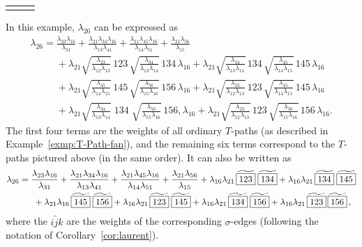 \documentclass[11pt]{article}
\numberwithin{equation}{section}
\numberwithin{equation}{section}
\begin{document}
\begin{Example}
\begin{center}
\begin{center}
\begin{tabular}{ccc}
\begin{tikzpicture}
\end{tikzpicture} 
\end{tabular}
\end{center}
\end{center}
In this example, $\lambda_{26}$ can be expressed as
 \begin{gather*}
 \lambda_{26} = \frac{\lambda_{23}\lambda_{16}}{\lambda_{31}}
 + \frac{\lambda_{21}\lambda_{34}\lambda_{16}}{\lambda_{13}\lambda_{41}}
 + \frac{\lambda_{21}\lambda_{45}\lambda_{16}}{\lambda_{14}\lambda_{51}}
 + \frac{\lambda_{21}\lambda_{56}}{\lambda_{15}} \\
 \phantom{\lambda_{26}=} + \lambda_{21} \sqrt{\frac{\lambda_{23}}{\lambda_{12}\lambda_{13}}} \, \boxed{123} \, \sqrt{\frac{\lambda_{34}}{\lambda_{13}\lambda_{14}}} \, \boxed{134} \, \lambda_{16}
+ \lambda_{21} \sqrt{\frac{\lambda_{34}}{\lambda_{13}\lambda_{14}}} \, \boxed{134} \, \sqrt{\frac{\lambda_{45}}{\lambda_{14}\lambda_{15}}} \, \boxed{145} \, \lambda_{16} \\
 \phantom{\lambda_{26}=} + \lambda_{21} \sqrt{\frac{\lambda_{45}}{\lambda_{14}\lambda_{15}}} \, \boxed{145} \, \sqrt{\frac{\lambda_{56}}{\lambda_{15}\lambda_{16}}} \, \boxed{156} \, \lambda_{16}
+ \lambda_{21} \sqrt{\frac{\lambda_{23}}{\lambda_{12}\lambda_{13}}} \, \boxed{123} \, \sqrt{\frac{\lambda_{45}}{\lambda_{14}\lambda_{15}}} \, \boxed{145} \, \lambda_{16} \\
 \phantom{\lambda_{26}=} + \lambda_{21} \sqrt{\frac{\lambda_{34}}{\lambda_{13}\lambda_{14}}} \; \boxed{134} \; \sqrt{\frac{\lambda_{56}}{\lambda_{15}\lambda_{16}}} \, \boxed{156} , \lambda_{16}
+ \lambda_{21} \sqrt{\frac{\lambda_{23}}{\lambda_{12}\lambda_{13}}} \, \boxed{123} \, \sqrt{\frac{\lambda_{56}}{\lambda_{15}\lambda_{16}}} \, \boxed{156} \, \lambda_{16}.
 \end{gather*}
 The first four terms are the weights of all ordinary $T$-paths (as described in Example~\ref{exmp:T-Path-fan}),
 and the remaining six terms correspond to the $T$-paths pictured above (in the same order).
 It can also be written as
 \begin{gather*}
 \lambda_{26} = \frac{\lambda_{23}\lambda_{16}}{\lambda_{31}}
 + \frac{\lambda_{21}\lambda_{34}\lambda_{16}}{\lambda_{13}\lambda_{41}}
 + \frac{\lambda_{21}\lambda_{45}\lambda_{16}}{\lambda_{14}\lambda_{51}}
 + \frac{\lambda_{21}\lambda_{56}}{\lambda_{15}}
 + \lambda_{16}\lambda_{21} \, \widetilde{\boxed{123}} \; \widetilde{\boxed{134}}
 + \lambda_{16}\lambda_{21} \, \widetilde{\boxed{134}} \; \widetilde{\boxed{145} }\\
 \hphantom{\lambda_{26} =}{}
 + \lambda_{21}\lambda_{16}\, \widetilde{\boxed{145}} \; \widetilde{\boxed{156} }
 + \lambda_{16}\lambda_{21} \, \widetilde{\boxed{123}} \; \widetilde{ \boxed{145}}
 + \lambda_{16}\lambda_{21} \, \widetilde{\boxed{134}}\;\widetilde{\boxed{156}}
 + \lambda_{16}\lambda_{21}\,
 \widetilde{ \boxed{123} }\, \widetilde{ \boxed{156}}\,,
 \end{gather*}
 where the $\widetilde{\boxed{ijk}}$ are the weights of the corresponding $\sigma$-edges (following the notation of Corollary~\ref{cor:laurent}).
\end{Example}
\end{document}
